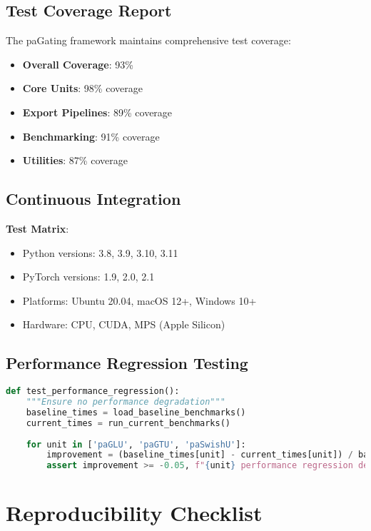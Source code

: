 \documentclass[journal]{IEEEtran}
\begin{document}
\subsection{Test Coverage Report}

The paGating framework maintains comprehensive test coverage:

\begin{itemize}
    \item \textbf{Overall Coverage}: 93\%
    \item \textbf{Core Units}: 98\% coverage
    \item \textbf{Export Pipelines}: 89\% coverage
    \item \textbf{Benchmarking}: 91\% coverage
    \item \textbf{Utilities}: 87\% coverage
\end{itemize}

\subsection{Continuous Integration}

\textbf{Test Matrix}:
\begin{itemize}
    \item Python versions: 3.8, 3.9, 3.10, 3.11
    \item PyTorch versions: 1.9, 2.0, 2.1
    \item Platforms: Ubuntu 20.04, macOS 12+, Windows 10+
    \item Hardware: CPU, CUDA, MPS (Apple Silicon)
\end{itemize}

\subsection{Performance Regression Testing}

\begin{lstlisting}[language=python]
def test_performance_regression():
    """Ensure no performance degradation"""
    baseline_times = load_baseline_benchmarks()
    current_times = run_current_benchmarks()
    
    for unit in ['paGLU', 'paGTU', 'paSwishU']:
        improvement = (baseline_times[unit] - current_times[unit]) / baseline_times[unit]
        assert improvement >= -0.05, f"{unit} performance regression detected"
\end{lstlisting}

\section{Reproducibility Checklist}
\end{document}
